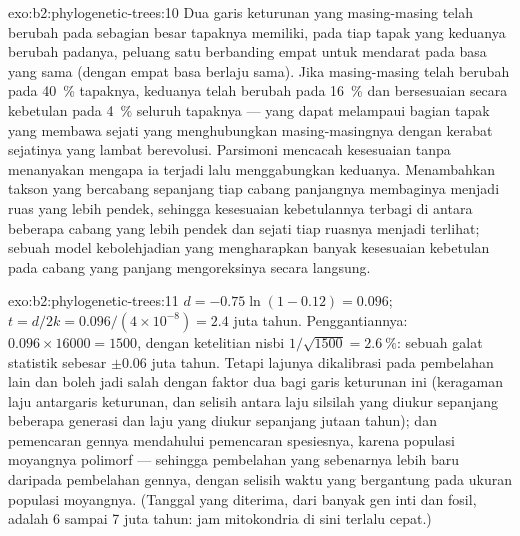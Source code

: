 \begin{solution}{exo:b2:phylogenetic-trees:10}
Dua garis keturunan yang masing-masing telah berubah pada sebagian
besar tapaknya memiliki, pada tiap tapak yang keduanya berubah
padanya, peluang satu berbanding empat untuk mendarat pada basa yang
sama (dengan empat basa berlaju sama). Jika masing-masing telah berubah
pada \qty{40}{\%} tapaknya, keduanya telah berubah pada \qty{16}{\%}
dan bersesuaian secara kebetulan pada \qty{4}{\%} seluruh tapaknya ---
yang dapat melampaui bagian tapak yang membawa  sejati yang
menghubungkan masing-masingnya dengan kerabat sejatinya yang lambat
berevolusi. Parsimoni mencacah kesesuaian tanpa menanyakan mengapa ia
terjadi lalu menggabungkan keduanya. Menambahkan takson yang bercabang
sepanjang tiap cabang panjangnya membaginya menjadi ruas yang lebih
pendek, sehingga kesesuaian kebetulannya terbagi di antara beberapa
cabang yang lebih pendek dan  sejati tiap ruasnya menjadi
terlihat; sebuah model kebolehjadian yang mengharapkan banyak
kesesuaian kebetulan pada cabang yang panjang mengoreksinya secara
langsung.
\end{solution}

\begin{solution}{exo:b2:phylogenetic-trees:11}
$d = -0.75\ln(1 - 0.12) = 0.096$; $t = d/2k = 0.096/(4\times 10^{-8})
= 2.4$ juta tahun. Penggantiannya: $0.096\times \num{16000} =
1500$, dengan ketelitian nisbi $1/\sqrt{1500} = \qty{2.6}{\%}$: sebuah
galat statistik sebesar $\pm 0.06$ juta tahun. Tetapi lajunya
dikalibrasi pada pembelahan lain dan boleh jadi salah dengan faktor dua
bagi garis keturunan ini (keragaman laju antargaris keturunan, dan
selisih antara laju silsilah yang diukur sepanjang beberapa generasi
dan laju yang diukur sepanjang jutaan tahun); dan pemencaran gennya
mendahului pemencaran spesiesnya, karena populasi moyangnya polimorf
--- sehingga pembelahan yang sebenarnya lebih baru daripada pembelahan
gennya, dengan selisih waktu yang bergantung pada ukuran populasi
moyangnya. (Tanggal yang diterima, dari banyak gen inti dan fosil,
adalah 6 sampai 7 juta tahun: jam mitokondria di sini terlalu cepat.)
\end{solution}

